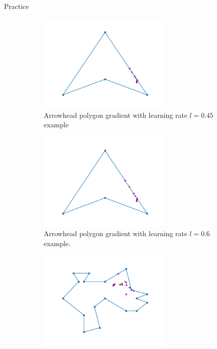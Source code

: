 \documentclass{beamer}
\begin{document}
\begin{frame}{Practice}
	\begin{figure}[h!]
		\centering
		\begin{subfigure}{0.45\textwidth}
			\centering
			\includegraphics[width = 0.7\textwidth]{Images/concave_triangle_gradient_045.png}
			\caption{Arrowhead polygon gradient with learning rate $l = 0.45$ example}
			\label{fig:concave_gradient_045}
		\end{subfigure}
		\begin{subfigure}{0.45\textwidth}
			\centering
			\includegraphics[width = 0.7\textwidth]{Images/concave_triangle_gradient_06.png}
			\caption{Arrowhead polygon gradient with learning rate $l = 0.6$ example.}
			\label{fig:concave_gradient_06}
		\end{subfigure}
		\begin{subfigure}{0.45\textwidth}
			\centering
			\includegraphics[width = 0.7\textwidth]{Images/random_gradient_045.png}

\end{subfigure}
\end{figure}
\end{frame}
\end{document}
